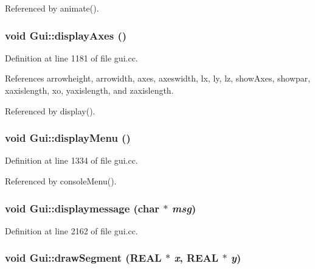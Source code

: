 Referenced by animate().\hypertarget{namespaceGui_2e3009086a3b9c82c98613657675c89a}{
\subsubsection[{displayAxes}]{\setlength{\rightskip}{0pt plus 5cm}void Gui::displayAxes ()}}
\label{namespaceGui_2e3009086a3b9c82c98613657675c89a}




Definition at line 1181 of file gui.cc.

References arrowheight, arrowidth, axes, axeswidth, lx, ly, lz, showAxes, showpar, xaxislength, xo, yaxislength, and zaxislength.

Referenced by display().\hypertarget{namespaceGui_5780bf157b4553f0002f9c0bac80c57c}{
\subsubsection[{displayMenu}]{\setlength{\rightskip}{0pt plus 5cm}void Gui::displayMenu ()}}
\label{namespaceGui_5780bf157b4553f0002f9c0bac80c57c}




Definition at line 1334 of file gui.cc.

Referenced by consoleMenu().\hypertarget{namespaceGui_3a5bf26c85086313b175ec4901ac04bd}{
\subsubsection[{displaymessage}]{\setlength{\rightskip}{0pt plus 5cm}void Gui::displaymessage (char $\ast$ {\em msg})}}
\label{namespaceGui_3a5bf26c85086313b175ec4901ac04bd}




Definition at line 2162 of file gui.cc.\hypertarget{namespaceGui_f509da960f39882c423601210a118a96}{
\subsubsection[{drawSegment}]{\setlength{\rightskip}{0pt plus 5cm}void Gui::drawSegment (REAL $\ast$ {\em x}, \/  REAL $\ast$ {\em y})}}
\label{namespaceGui_f509da960f39882c423601210a118a96}


